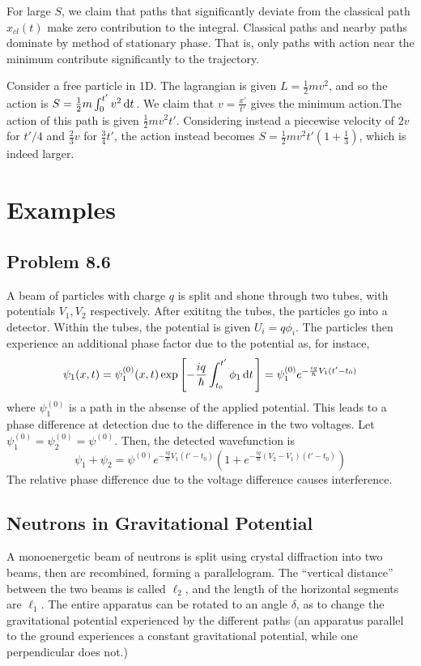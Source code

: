 For large \(S\), we claim that paths that significantly deviate from the classical path \(x_{cl}(t)\) make zero contribution to the integral. Classical paths and nearby paths dominate by method of stationary phase. That is, only paths with action near the minimum contribute significantly to the trajectory. 

\begin{aside}
	Consider a free particle in 1D. The lagrangian is given \(L = \frac{1}{2}mv^2\), and so the action is \(S = \frac{1}{2}m\int_0^{t'}v^2\d{t}\). We claim that \(v = \frac{x'}{t'}\) gives the minimum action.The action of this path is given \(\frac{1}{2}mv^2t'\). Considering instead a piecewise velocity of \(2v\) for \(t'/4\) and \(\frac{2}{3}v\) for \(\frac{3}{4}t'\), the action instead becomes \(S = \frac{1}{2}mv^2t'(1+\frac{1}{3})\), which is indeed larger.	
\end{aside}

\section{Examples}
\subsection{Problem 8.6}
A beam of particles with charge \(q\) is split and shone through two tubes, with potentials \(V_1,V_2\) respectively. After exititng the tubes, the particles go into a detector. Within the tubes, the potential is given \(U_i = q\phi_i\). The particles then experience an additional phase factor due to the potential as, for instace,
\[\psi_1(x,t) = \psi_{1}^{(0)}(x,t)\exp\left[-\frac{iq}{\hbar}\int_{t_0}^{t'}\phi_1\d{t}\right] = \psi_{1}^{(0)}e^{-\frac{iq}{\hbar}V_1(t'-t_0)}\]
where \(\psi_1^{(0)}\) is a path in the absense of the applied potential. This leads to a phase difference at detection due to the difference in the two voltages. Let \(\psi_{1}^{(0)} = \psi_2^{(0)} = \psi^{(0)}\). Then, the detected wavefunction is
\[\psi_1+\psi_2 = \psi^{(0)}e^{-\frac{iq}{\hbar}V_1 (t'-t_0)}\left(1+e^{-\frac{iq}{\hbar}(V_2-V_1)(t'-t_0)}\right)\]
The relative phase difference due to the voltage difference causes interference.

\subsection{Neutrons in Gravitational Potential}
A monoenergetic beam of neutrons is split using crystal diffraction into two beams, then are recombined, forming a parallelogram. The ``vertical distance'' between the two beams is called \(\ell_2\), and the length of the horizontal segments are \(\ell_1\). The entire apparatus can be rotated to an angle \(\delta\), as to change the gravitational potential experienced by the different paths (an apparatus parallel to the ground  experiences a constant gravitational potential, while one perpendicular does not.) 

